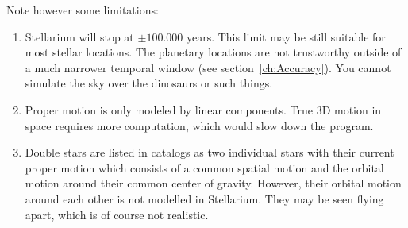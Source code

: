 Note however some limitations:
\begin{enumerate}
\item Stellarium will stop at $\pm 100.000$ years. This limit may be
  still suitable for most stellar locations. The planetary locations
  are not trustworthy outside of a much narrower temporal window (see
  section~\ref{ch:Accuracy}). You cannot simulate the sky over the
  dinosaurs or such things.
\item Proper motion is only modeled by linear components. True 3D
  motion in space requires more computation, which would slow down the
  program.
\item Double stars are listed in catalogs as two individual stars with
  their current proper motion which consists of a common spatial motion and the 
  orbital motion around their common center of gravity. However, their orbital
  motion around each other is not modelled in Stellarium.  They may be seen flying 
  apart, which is of course not realistic.
\end{enumerate}

